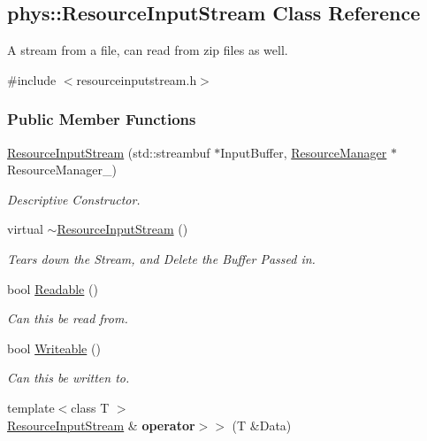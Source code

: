 \hypertarget{classphys_1_1ResourceInputStream}{
\subsection{phys::ResourceInputStream Class Reference}
\label{dc/d52/classphys_1_1ResourceInputStream}
}


A stream from a file, can read from zip files as well.  




{\ttfamily \#include $<$resourceinputstream.h$>$}

\subsubsection*{Public Member Functions}
\begin{DoxyCompactItemize}
\item 
\hyperlink{classphys_1_1ResourceInputStream_a890b739ac7f1c68108dc29f6887d2fa2}{ResourceInputStream} (std::streambuf $\ast$InputBuffer, \hyperlink{classphys_1_1ResourceManager}{ResourceManager} $\ast$ResourceManager\_\-)
\begin{DoxyCompactList}\small\item\em Descriptive Constructor. \item\end{DoxyCompactList}\item 
\hypertarget{classphys_1_1ResourceInputStream_a03b9d40f0b006edd6daf25e93084f80d}{
virtual \hyperlink{classphys_1_1ResourceInputStream_a03b9d40f0b006edd6daf25e93084f80d}{$\sim$ResourceInputStream} ()}
\label{dc/d52/classphys_1_1ResourceInputStream_a03b9d40f0b006edd6daf25e93084f80d}

\begin{DoxyCompactList}\small\item\em Tears down the Stream, and Delete the Buffer Passed in. \item\end{DoxyCompactList}\item 
bool \hyperlink{classphys_1_1ResourceInputStream_a4900f77dd452c2a2ddf47a76d36d85c3}{Readable} ()
\begin{DoxyCompactList}\small\item\em Can this be read from. \item\end{DoxyCompactList}\item 
bool \hyperlink{classphys_1_1ResourceInputStream_a6e7619bf3efd3b344fab92d326385009}{Writeable} ()
\begin{DoxyCompactList}\small\item\em Can this be written to. \item\end{DoxyCompactList}\item 
\hypertarget{classphys_1_1ResourceInputStream_a40a93720c3a4a9fb8c2c082c00574912}{
{\footnotesize template$<$class T $>$ }\\\hyperlink{classphys_1_1ResourceInputStream}{ResourceInputStream} \& {\bfseries operator$>$$>$} (T \&Data)}
\label{dc/d52/classphys_1_1ResourceInputStream_a40a93720c3a4a9fb8c2c082c00574912}


\end{DoxyCompactItemize}
